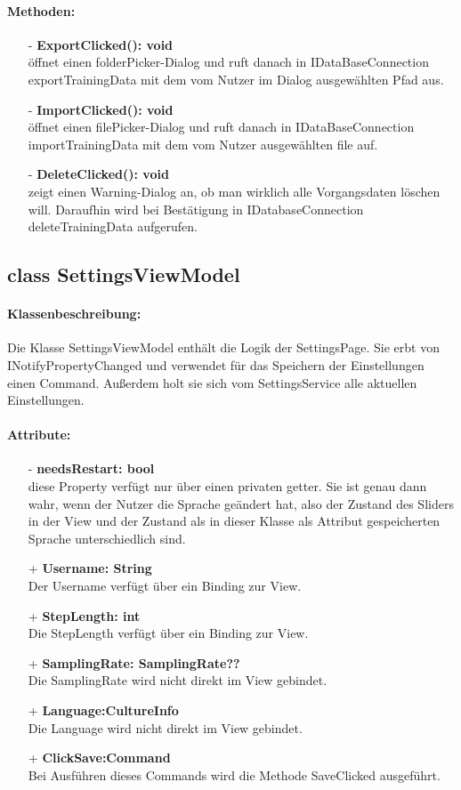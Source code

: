 \documentclass[a4paper,12pt]{article}
\begin{document}
\paragraph{Methoden:}
\begin{itemize}
    \item[-] \textbf{ExportClicked(): void}\\ öffnet einen folderPicker-Dialog und ruft danach in IDataBaseConnection exportTrainingData mit dem vom Nutzer im Dialog ausgewählten Pfad aus.%
    \item[-] \textbf{ImportClicked(): void}\\ öffnet einen filePicker-Dialog und ruft danach in IDataBaseConnection importTrainingData mit dem vom Nutzer ausgewählten file auf.
    \item[-] \textbf{DeleteClicked(): void}\\zeigt einen Warning-Dialog an, ob man wirklich alle Vorgangsdaten löschen will. Daraufhin wird bei Bestätigung in IDatabaseConnection deleteTrainingData aufgerufen.
\end{itemize} 

\subsection{class SettingsViewModel}

\paragraph{Klassenbeschreibung:}
Die Klasse SettingsViewModel enthält die Logik der SettingsPage. Sie erbt von INotifyPropertyChanged und verwendet für das Speichern der Einstellungen einen Command. Außerdem holt sie sich vom SettingsService alle aktuellen Einstellungen.
\paragraph{Attribute:}
\begin{itemize}
	\item[-] \textbf{needsRestart: bool}\\ diese Property verfügt nur über einen privaten getter. Sie ist genau dann wahr, wenn der Nutzer die Sprache geändert hat, also der Zustand des Sliders in der View und der Zustand als in dieser Klasse als Attribut gespeicherten Sprache unterschiedlich sind.
	\item[+] \textbf{Username: String}\\Der Username verfügt über ein Binding zur View.
	\item[+] \textbf{StepLength: int}\\Die StepLength verfügt über ein Binding zur View. 
	\item[+] \textbf{SamplingRate: SamplingRate??}\\Die SamplingRate wird nicht direkt im View gebindet.
	\item[+] \textbf{Language:CultureInfo}\\Die Language wird nicht direkt im View gebindet. 
	\item[+] \textbf{ClickSave:Command}\\Bei Ausführen dieses Commands wird die Methode SaveClicked ausgeführt. 
\end{itemize}
\end{document}
